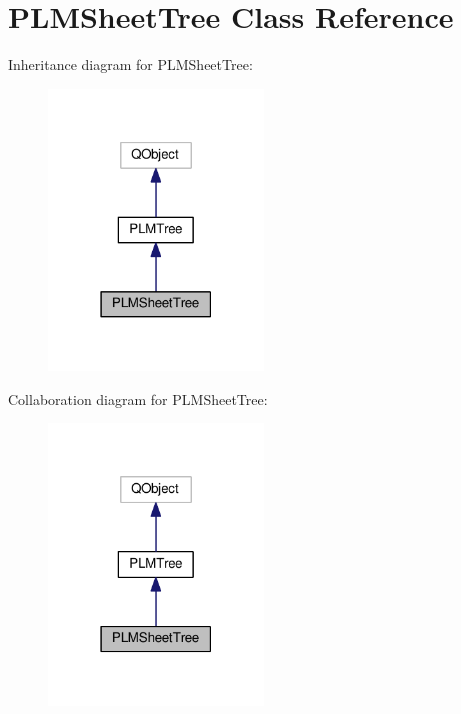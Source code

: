 \hypertarget{class_p_l_m_sheet_tree}{}\section{P\+L\+M\+Sheet\+Tree Class Reference}
\label{class_p_l_m_sheet_tree}


Inheritance diagram for P\+L\+M\+Sheet\+Tree\+:\nopagebreak
\begin{figure}[H]
\begin{center}
\leavevmode
\includegraphics[width=162pt]{class_p_l_m_sheet_tree__inherit__graph}
\end{center}
\end{figure}


Collaboration diagram for P\+L\+M\+Sheet\+Tree\+:\nopagebreak
\begin{figure}[H]
\begin{center}
\leavevmode
\includegraphics[width=162pt]{class_p_l_m_sheet_tree__coll__graph}
\end{center}
\end{figure}

